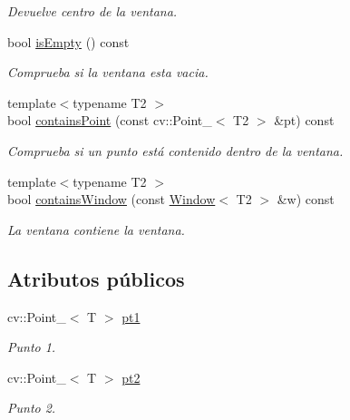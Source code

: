 \begin{DoxyCompactItemize}
\begin{DoxyCompactList}\small\item\em Devuelve centro de la ventana. \end{DoxyCompactList}\item 
bool \hyperlink{group___geometric_entities_ga538a75457375309a2a519a8b40185bf3}{is\+Empty} () const 
\begin{DoxyCompactList}\small\item\em Comprueba si la ventana esta vacia. \end{DoxyCompactList}\item 
{\footnotesize template$<$typename T2 $>$ }\\bool \hyperlink{group___geometric_entities_gadedaaec93c260131acb5bf30b2e14dda}{contains\+Point} (const cv\+::\+Point\+\_\+$<$ T2 $>$ \&pt) const 
\begin{DoxyCompactList}\small\item\em Comprueba si un punto está contenido dentro de la ventana. \end{DoxyCompactList}\item 
{\footnotesize template$<$typename T2 $>$ }\\bool \hyperlink{group___geometric_entities_ga39b646714c642da0cce15bfe311d1d5c}{contains\+Window} (const \hyperlink{class_i3_d_1_1_window}{Window}$<$ T2 $>$ \&w) const 
\begin{DoxyCompactList}\small\item\em La ventana contiene la ventana. \end{DoxyCompactList}\end{DoxyCompactItemize}
\subsection*{Atributos públicos}
\begin{DoxyCompactItemize}
\item 
cv\+::\+Point\+\_\+$<$ T $>$ \hyperlink{class_i3_d_1_1_window_a067d3a7971d68c3920cfca5a4b5358c1}{pt1}
\begin{DoxyCompactList}\small\item\em Punto 1. \end{DoxyCompactList}\item 
cv\+::\+Point\+\_\+$<$ T $>$ \hyperlink{class_i3_d_1_1_window_ad4d4d2689f3ccd2e695506dcb55e1d44}{pt2}
\begin{DoxyCompactList}\small\item\em Punto 2. \end{DoxyCompactList}\end{DoxyCompactItemize}


